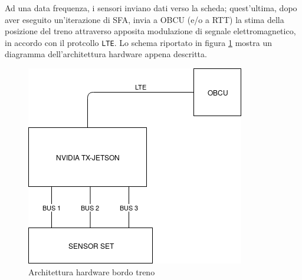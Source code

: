  Ad una data frequenza, i sensori inviano dati verso la scheda; quest'ultima, dopo aver eseguito un'iterazione di SFA, invia a OBCU (e/o a RTT) la stima della posizione del treno attraverso apposita modulazione di segnale elettromagnetico, in accordo con il protcollo \texttt{LTE}. Lo schema riportato in figura \ref{fig:tdiagram} mostra un diagramma dell'architettura hardware appena descritta.
\begin{figure}[h]
	\centering
	\includegraphics[width=0.7\linewidth]{img/TrainDiagram}
	\caption{Architettura hardware bordo treno}
	\label{fig:tdiagram}
\end{figure}
